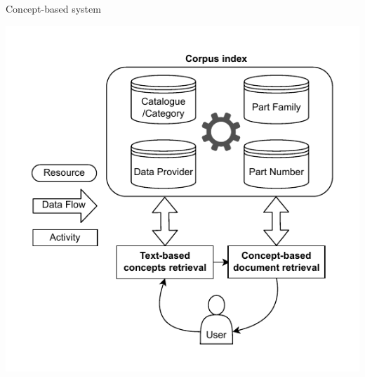 \begin{frame}{Concept-based system}

    \vspace{-1em}
    \begin{center}
        \includegraphics[scale=0.8]{images/tp-expe-concept-based-sys-legende.pdf} 
    \end{center}

\end{frame}

